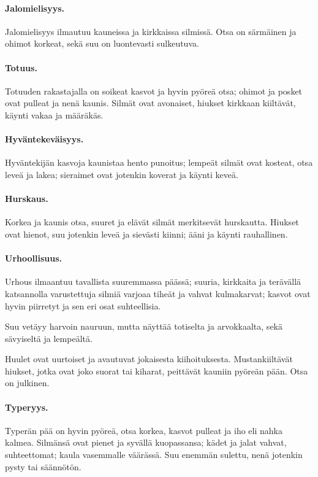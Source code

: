 \documentclass[11pt, twoside, finnish, a5paper]{book}
\begin{document}
\paragraph{Jalomielisyys.}
Jalomielisyys ilmautuu kauneissa ja kirkkaissa silmissä.
Otsa on särmäinen ja ohimot korkeat, sekä suu on
luontevasti sulkeutuva.

\paragraph{Totuus.}
Totuuden rakastajalla on soikeat kasvot ja hyvin
pyöreä otsa; ohimot ja posket ovat pulleat ja nenä
kaunis. Silmät ovat avonaiset, hiukset kirkkaan kiiltävät,
käynti vakaa ja määräkäs.

\paragraph{Hyväntekeväisyys.}
Hyväntekijän kasvoja kaunistaa hento punoitus; lempeät
silmät ovat kosteat, otsa leveä ja lakea; sieraimet
ovat jotenkin koverat ja käynti keveä.

\paragraph{Hurskaus.}
Korkea ja kaunis otsa, suuret ja elävät silmät merkitsevät
hurskautta. Hiukset ovat hienot, suu jotenkin
leveä ja sievästi kiinni; ääni ja käynti rauhallinen.

\paragraph{Urhoollisuus.}
Urhous ilmaantuu tavallista suuremmassa päässä; suuria, 
kirkkaita ja terävällä katsannolla varustettuja silmiä
varjoaa tiheät ja vahvat kulmakarvat; kasvot ovat hyvin
piirretyt ja sen eri osat suhteellisia.

Suu vetäyy harvoin nauruun, mutta näyttää totiselta
ja arvokkaalta, sekä sävyiseltä ja lempeältä.

Huulet ovat uurtoiset ja avautuvat jokaisesta kiihoituksesta.
Mustankiiltävät hiukset, jotka ovat joko suorat
tai kiharat, peittävät kauniin pyöreän pään. Otsa on julkinen.

\paragraph{Typeryys.}
Typerän pää on hyvin pyöreä, otsa korkea, kasvot
pulleat ja iho eli nahka kalmea. Silmänsä ovat pienet ja
syvällä kuopassansa; kädet ja jalat vahvat, suhteettomat;
kaula vasemmalle väärässä. Suu enemmän sulettu,
nenä jotenkin pysty tai säännötön.
\end{document}
